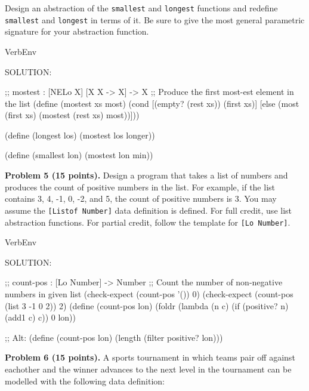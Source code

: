 \documentclass[12pt]{article}
\begin{document}
Design an abstraction of the {\tt smallest} and {\tt longest}
functions and redefine {\tt smallest} and {\tt longest} in terms of
it.  Be sure to give the most general parametric signature for your
abstraction function.


\newpage


\begin{SaveVerbatim}{VerbEnv}

SOLUTION:

;; mostest : [NELo X] [X X -> X] -> X
;; Produce the first most-est element in the list
(define (mostest xs most)
  (cond [(empty? (rest xs)) (first xs)]
        [else
          (most (first xs)
                (mostest (rest xs) most))]))

(define (longest los)
  (mostest los longer))

(define (smallest lon)
  (mostest lon min))
\end{SaveVerbatim}




\newpage
\noindent
{\bf Problem 5 (15 points).}  
%
Design a program that takes a list of numbers and produces the count
of positive numbers in the list.  For example, if the list contains 3,
4, -1, 0, -2, and 5, the count of positive numbers is 3.  You may
assume the {\tt{[Listof Number]}} data definition is defined.
%
For full credit, use list abstraction functions.  For partial credit,
follow the template for {\tt{[Lo Number]}}.


\begin{SaveVerbatim}{VerbEnv}

SOLUTION:

;; count-pos : [Lo Number] -> Number
;; Count the number of non-negative numbers in given list
(check-expect (count-pos '()) 0)
(check-expect (count-pos (list 3 -1 0 2)) 2)
(define (count-pos lon)
  (foldr (lambda (n c) (if (positive? n) (add1 c) c)) 0 lon))

;; Alt:
(define (count-pos lon)
  (length (filter positive? lon)))
\end{SaveVerbatim}




\newpage

\noindent
{\bf Problem 6 (15 points).}
%
A sports tournament in which teams pair off against eachother and
the winner advances to the next level in the tournament can be modelled
with the following data definition:
\end{document}
